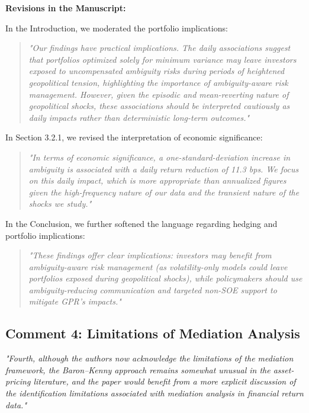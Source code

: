 \documentclass[12pt]{article}
\begin{document}
\begin{highlightbox}
\textbf{Revisions in the Manuscript:}

In the Introduction, we moderated the portfolio implications:
\vspace{0.2cm}
\begin{quote}
\color{red}\itshape "Our findings have practical implications. The daily associations suggest that portfolios optimized solely for minimum variance may leave investors exposed to uncompensated ambiguity risks during periods of heightened geopolitical tension, highlighting the importance of ambiguity-aware risk management. However, given the episodic and mean-reverting nature of geopolitical shocks, these associations should be interpreted cautiously as daily impacts rather than deterministic long-term outcomes."
\end{quote}
\vspace{0.2cm}

In Section 3.2.1, we revised the interpretation of economic significance:
\vspace{0.2cm}
\begin{quote}
\color{red}\itshape "In terms of economic significance, a one-standard-deviation increase in ambiguity is associated with a daily return reduction of 11.3 bps. We focus on this daily impact, which is more appropriate than annualized figures given the high-frequency nature of our data and the transient nature of the shocks we study."
\end{quote}
\vspace{0.2cm}

In the Conclusion, we further softened the language regarding hedging and portfolio implications:
\vspace{0.2cm}
\begin{quote}
\color{red}\itshape "These findings offer clear implications: investors may benefit from ambiguity-aware risk management (as volatility-only models could leave portfolios exposed during geopolitical shocks), while policymakers should use ambiguity-reducing communication and targeted non-SOE support to mitigate GPR’s impacts."
\end{quote}
\end{highlightbox}

\subsection*{Comment 4: Limitations of Mediation Analysis}
\textit{"Fourth, although the authors now acknowledge the limitations of the mediation framework, the Baron–Kenny approach remains somewhat unusual in the asset-pricing literature, and the paper would benefit from a more explicit discussion of the identification limitations associated with mediation analysis in financial return data."}
\end{document}
